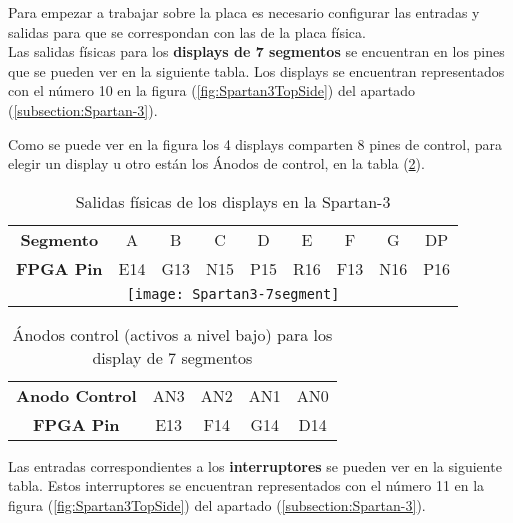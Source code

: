 Para empezar a trabajar sobre la placa es necesario configurar las entradas y salidas para que se correspondan con las de la placa física.\\ 

Las salidas físicas para los \textbf{displays de 7 segmentos} se encuentran en los pines que se pueden ver en la siguiente tabla. Los displays se encuentran representados con el número 10 en la figura (\ref{fig:Spartan3TopSide}) del apartado (\ref{subsection:Spartan-3}).

Como se puede ver en la figura los 4 displays comparten 8 pines de control, para elegir un display u otro están los Ánodos de control, en la tabla (\ref{tab:anodoControl}).

\begin{table}[H]
        \centering
		\begin{tabular}{|c|c|c|c|c|c|c|c|c|}
			\hline
			\rowcolor[rgb]{0.21,0.69,0.87}\multicolumn{9}{|c|}{  \textbf{ {Salidas físicas Display 7 segmentos}}} \\
			\hline \hline
			\textbf{  Segmento  } & A & B & C & D & E & F & G & DP \\ 
			\hline
			\textbf{  FPGA Pin  }  & E14 & G13 & N15 & P15 & R16 & F13 & N16 & P16 \\ 
			\hline
			\multicolumn{9}{|c|}{\texttt{[image: Spartan3-7segment]}}\\
			\hline
			 
		\end{tabular}
	\caption{ Salidas físicas de los displays en la Spartan-3 }
	\label{tab:tablaSalidas7Segmentos}
\end{table}

\begin{table}[H]
        \centering
		\begin{tabular}{|c|c|c|c|c|}
			\hline
			\rowcolor[rgb]{0.21,0.69,0.87}\multicolumn{5}{|c|}{  \textbf{ {Ánodos de control}}} \\
			\hline \hline
			\textbf{  Anodo Control  } & AN3 & AN2 & AN1 & AN0  \\
			\hline
			\textbf{  FPGA Pin  } & E13 & F14 & G14 & D14  \\
			\hline
			 
		\end{tabular}
	\caption{ Ánodos control (activos a nivel bajo) para los display de 7 segmentos }
	\label{tab:anodoControl}
\end{table}

Las entradas correspondientes a los \textbf{interruptores} se pueden ver en la siguiente tabla. Estos interruptores se encuentran representados con el número 11 en la figura (\ref{fig:Spartan3TopSide}) del apartado (\ref{subsection:Spartan-3}).

